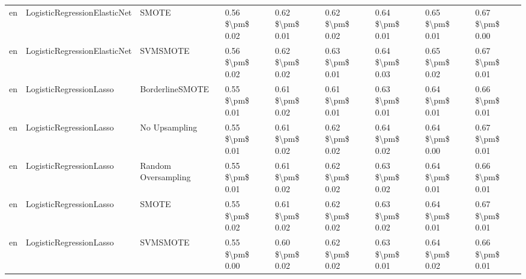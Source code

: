 \begin{tabular}{lllllllll}
      en &    LogisticRegressionElasticNet &                         SMOTE & 0.56 \$\textbackslash pm\$ 0.02 &           0.62 \$\textbackslash pm\$ 0.01 &       0.62 \$\textbackslash pm\$ 0.02 &        0.64 \$\textbackslash pm\$ 0.01 &                         0.65 \$\textbackslash pm\$ 0.01 &     0.67 \$\textbackslash pm\$ 0.00 \\
      en &    LogisticRegressionElasticNet &                      SVMSMOTE & 0.56 \$\textbackslash pm\$ 0.02 &           0.62 \$\textbackslash pm\$ 0.02 &       0.63 \$\textbackslash pm\$ 0.01 &        0.64 \$\textbackslash pm\$ 0.03 &                         0.65 \$\textbackslash pm\$ 0.02 &     0.67 \$\textbackslash pm\$ 0.01 \\
      en &         LogisticRegressionLasso &               BorderlineSMOTE & 0.55 \$\textbackslash pm\$ 0.01 &           0.61 \$\textbackslash pm\$ 0.02 &       0.61 \$\textbackslash pm\$ 0.01 &        0.63 \$\textbackslash pm\$ 0.01 &                         0.64 \$\textbackslash pm\$ 0.01 &     0.66 \$\textbackslash pm\$ 0.01 \\
      en &         LogisticRegressionLasso &                 No Upsampling & 0.55 \$\textbackslash pm\$ 0.01 &           0.61 \$\textbackslash pm\$ 0.02 &       0.62 \$\textbackslash pm\$ 0.02 &        0.64 \$\textbackslash pm\$ 0.02 &                         0.64 \$\textbackslash pm\$ 0.00 &     0.67 \$\textbackslash pm\$ 0.01 \\
      en &         LogisticRegressionLasso &           Random Oversampling & 0.55 \$\textbackslash pm\$ 0.01 &           0.61 \$\textbackslash pm\$ 0.02 &       0.62 \$\textbackslash pm\$ 0.02 &        0.63 \$\textbackslash pm\$ 0.02 &                         0.64 \$\textbackslash pm\$ 0.01 &     0.66 \$\textbackslash pm\$ 0.01 \\
      en &         LogisticRegressionLasso &                         SMOTE & 0.55 \$\textbackslash pm\$ 0.02 &           0.61 \$\textbackslash pm\$ 0.02 &       0.62 \$\textbackslash pm\$ 0.02 &        0.63 \$\textbackslash pm\$ 0.02 &                         0.64 \$\textbackslash pm\$ 0.01 &     0.67 \$\textbackslash pm\$ 0.01 \\
      en &         LogisticRegressionLasso &                      SVMSMOTE & 0.55 \$\textbackslash pm\$ 0.00 &           0.60 \$\textbackslash pm\$ 0.02 &       0.62 \$\textbackslash pm\$ 0.02 &        0.63 \$\textbackslash pm\$ 0.01 &                         0.64 \$\textbackslash pm\$ 0.02 &     0.66 \$\textbackslash pm\$ 0.01 \\

\end{tabular}
